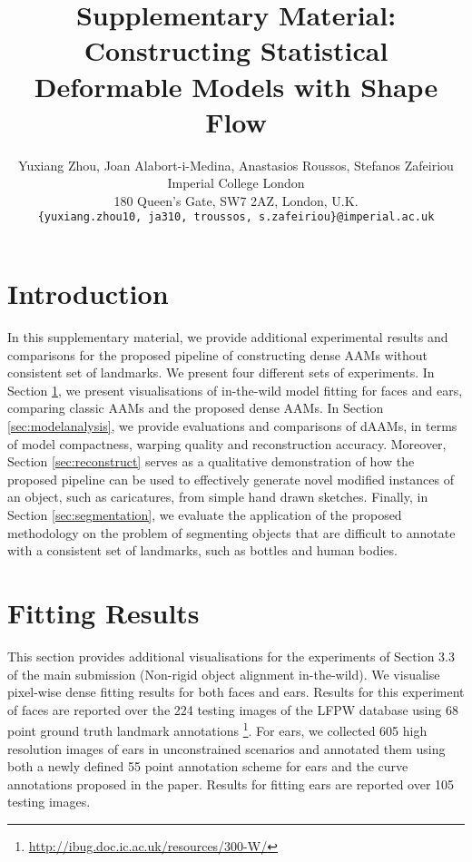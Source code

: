 






\title{Supplementary Material: Constructing Statistical Deformable Models with Shape Flow}

\author{Yuxiang Zhou, Joan Alabort-i-Medina, Anastasios Roussos, Stefanos Zafeiriou\\
Imperial College London\\
180 Queen’s Gate, SW7 2AZ, London, U.K.\\
{\tt\small \{yuxiang.zhou10, ja310, troussos, s.zafeiriou\}@imperial.ac.uk}}
\maketitle
\thispagestyle{empty}


\section*{Introduction}
In this supplementary material, we provide additional experimental results and comparisons for the proposed pipeline of constructing dense AAMs without consistent set of landmarks. 
We present four different sets of experiments. 
In Section \ref{sec:fittingresults}, we present visualisations of in-the-wild model fitting  for faces and ears, comparing classic AAMs and the proposed dense AAMs. In Section \ref{sec:modelanalysis}, we provide evaluations and comparisons of dAAMs, in terms of model compactness, warping quality and reconstruction accuracy. 
Moreover, Section \ref{sec:reconstruct} serves as a qualitative demonstration of how the proposed pipeline can be used to effectively generate novel modified instances of an object, such as caricatures, from simple hand drawn sketches.
Finally, in Section \ref{sec:segmentation}, we evaluate the application of the proposed methodology on the problem of segmenting objects that are difficult to annotate with a consistent set of landmarks, such as bottles and human bodies.

\appendix
\section{Fitting Results}
\label{sec:fittingresults}

This section provides additional visualisations for the experiments of Section 3.3 of the main submission (Non-rigid object alignment in-the-wild). We visualise pixel-wise dense fitting results for both faces and ears. Results for this experiment of faces are reported over the 224 testing images of the LFPW database using 68 point ground truth landmark annotations
\footnote{\label{ibug_300} \url{http://ibug.doc.ic.ac.uk/resources/300-W/}}. 
For ears, we collected 605 high resolution images of ears in unconstrained scenarios and annotated them using both a newly defined 55 point annotation scheme for ears and the curve annotations proposed in the paper. Results for fitting ears are reported over 105 testing images.

